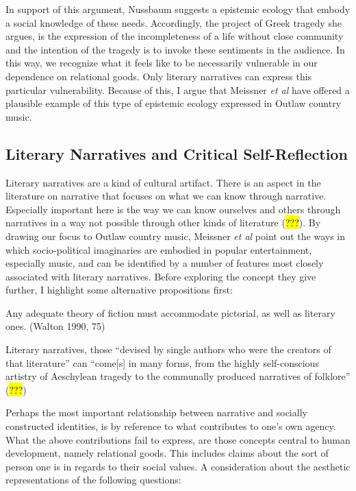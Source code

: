 \documentclass[
  letterpaper,
  DIV=11,
  numbers=noendperiod]{scrartcl}
\theoremstyle{remark}
\begin{document}
In support of this argument, Nussbaum suggests a epistemic ecology that
embody a social knowledge of these needs. Accordingly, the project of
Greek tragedy she argues, is the expression of the incompleteness of a
life without close community and the intention of the tragedy is to
invoke these sentiments in the audience. In this way, we recognize what
it feels like to be necessarily vulnerable in our dependence on
relational goods. Only literary narratives can express this particular
vulnerability. Because of this, I argue that Meissner \emph{et al} have
offered a plausible example of this type of epistemic ecology expressed
in Outlaw country music.

\subsection{Literary Narratives and Critical
Self-Reflection}\label{literary-narratives-and-critical-self-reflection}

Literary narratives are a kind of cultural artifact. There is an aspect
in the literature on narrative that focuses on what we can know through
narrative. Especially important here is the way we can know ourselves
and others through narratives in a way not possible through other kinds
of literature (\hl{???}). By drawing our focus to Outlaw country music,
Meissner \emph{et al} point out the ways in which socio-political
imaginaries are embodied in popular entertainment, especially music, and
can be identified by a number of features most closely associated with
literary narratives. Before exploring the concept they give further, I
highlight some alternative propositions first:

Any adequate theory of fiction must accommodate pictorial, as well as
literary ones. (Walton 1990, 75)

Literary narratives, those ``devised by single authors who were the
creators of that literature'' can ``come{[}s{]} in many forms, from the
highly self-conscious artistry of Aeschylean tragedy to the communally
produced narratives of folklore'' (\hl{???})

Perhaps the most important relationship between narrative and socially
constructed identities, is by reference to what contributes to one's own
agency. What the above contributions fail to express, are those concepts
central to human development, namely relational goods. This includes
claims about the sort of person one is in regards to their social
values. A consideration about the aesthetic representations of the
following questions:
\end{document}
